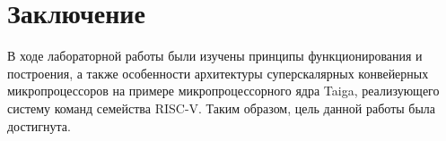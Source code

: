 \chapter*{Заключение}

В ходе лабораторной работы были изучены принципы функционирования и построения,
а также особенности архитектуры суперскалярных конвейерных микропроцессоров на
примере микропроцессорного ядра Taiga, реализующего систему команд семейства
RISC-V. Таким образом, цель данной работы была достигнута.

